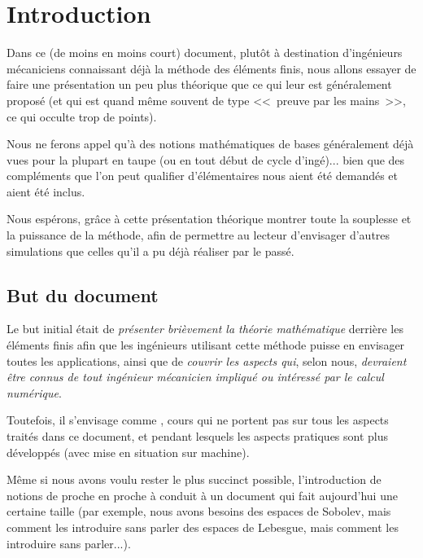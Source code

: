 \documentclass[11pt,pdflatex]{book}
\begin{document}
\chapter*{Introduction}

Dans ce (de moins en moins court) document, plutôt à destination d'ingénieurs
mécaniciens connaissant déjà la méthode des éléments finis,
nous allons essayer de faire une présentation un peu plus théorique que ce qui 
leur est généralement proposé (et qui est quand même souvent de type 
<<~preuve par les mains~>>, ce qui occulte trop de points).

Nous ne ferons appel qu'à des notions mathématiques de bases généralement 
déjà vues pour la plupart en taupe (ou en tout début de cycle d'ingé)... bien
que des compléments que l'on peut qualifier d'élémentaires nous aient été
demandés et aient été inclus.

Nous espérons, grâce à cette présentation théorique
montrer toute la souplesse et la puissance de la méthode, afin
de permettre au lecteur d'envisager d'autres simulations que celles
qu'il a pu déjà réaliser par le passé.





\bigskip
\section*{But du document}

Le but initial était de \emph{présenter brièvement la théorie mathématique} derrière
les éléments finis afin que les ingénieurs utilisant cette méthode puisse en envisager
toutes les applications, ainsi que de \emph{couvrir les aspects qui}, selon nous, \emph{devraient être
connus de tout ingénieur mécanicien impliqué ou intéressé par le calcul numérique}.

Toutefois, il s'envisage comme , 
cours qui ne portent pas sur tous les aspects traités dans ce document, et pendant lesquels les aspects 
pratiques sont plus développés (avec mise en situation sur machine).

\medskip
Même si nous avons voulu rester le plus succinct possible, l'introduction de
notions de proche en proche à conduit à un document qui fait aujourd'hui une
certaine taille (par exemple, nous avons besoins des espaces de Sobolev, mais
comment les introduire sans parler des espaces de Lebesgue, mais comment
les introduire sans parler...).
\end{document}
